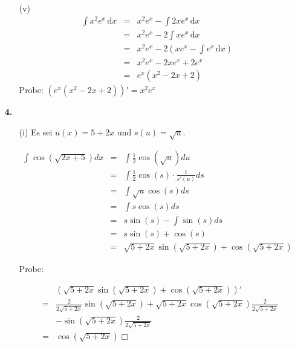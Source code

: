 \documentclass[a4paper,11pt,fleqn]{scrartcl}
\newcommand{\bra}[1]{\left(#1\right)}
\newcommand{\dx}[0]{\, \mathrm{d}x}
\begin{document}
\begin{enumerate}
\begin{enumerate}
            \item[(v)]
            \begin{eqnarray*}
                \int x^2e^x\, \mathrm{d}x &=& x^2e^x - \int 2xe^x \dx \\
                &=& x^2e^x - 2 \int xe^x \dx \\
                &=& x^2e^x - 2 \left( xe^x - \int e^x \dx \right) \\
                &=& x^2e^x - 2xe^x + 2e^x \\
                &=& e^x(x^2 - 2x + 2)
            \end{eqnarray*}
            Probe: $(e^x(x^2 - 2x + 2))' = x^2e^x$
        \end{enumerate}

    \item[\textbf{4.}]
        \begin{enumerate}
            \item[(i)]
                Es sei $u(x) = 5 + 2x$ und $s(u) = \sqrt{u}$.

                \begin{eqnarray*}
                    \int \cos(\sqrt{2x+5}) dx
                    &=& \int \frac{1}{2} \cos(\sqrt{u}) du \\
                    &=& \int \frac{1}{2} \cos(s) \cdot \frac{1}{s'(u)} ds \\
                    &=& \int \sqrt{u} \cos(s) ds \\
                    &=& \int s \cos(s) ds \\
                    &=& s \sin(s) - \int \sin(s) ds \\
                    &=& s \sin(s) + \cos(s) \\
                    &=& \sqrt{5+2x} \sin(\sqrt{5+2x}) + \cos(\sqrt{5+2x})
                \end{eqnarray*}

                Probe:

                \begin{eqnarray*}
                    && \bra{\sqrt{5+2x} \sin(\sqrt{5+2x}) + \cos(\sqrt{5+2x})}' \\
                    &=& \frac{2}{2\sqrt{5+2x}} \sin(\sqrt{5+2x}) + \sqrt{5+2x} \cos(\sqrt{5+2x}) \frac{2}{2\sqrt{5+2x}} \\
                    && - \sin(\sqrt{5+2x}) \frac{2}{2\sqrt{5+2x}}\\
                    &=& \cos(\sqrt{5+2x}) \Box
                \end{eqnarray*}


\end{enumerate}
\end{enumerate}
\end{document}

